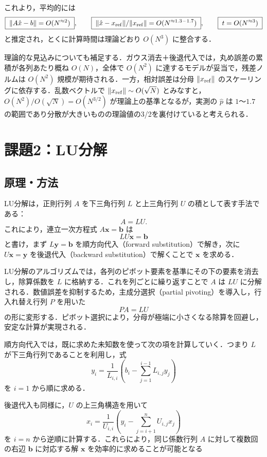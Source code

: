\documentclass[a4paper,11pt]{ltjsarticle}
\begin{document}
これより，平均的には
\[
\boxed{\;\|A\hat x-b\|=O(N^{\approx 2})\;},\qquad
\boxed{\;\|\hat x-x_{\rm ref}\|/\|x_{\rm ref}\|=O(N^{\approx 1.3\,\text{--}\,1.7})\;},\qquad
\boxed{\;t=O(N^{\approx 3})\;}
\]
と推定され，とくに計算時間は理論どおり $O(N^3)$ に整合する．

理論的な見込みについても補足する．ガウス消去＋後退代入では，丸め誤差の累積が各列あたり概ね $O(N)$，全体で $O(N^2)$ に達するモデルが妥当で，残差ノルムは $O(N^2)$ 規模が期待される．一方，相対誤差は分母 $\|x_{\rm ref}\|$ のスケーリングに依存する．乱数ベクトルで $\|x_{\rm ref}\|\sim O(\sqrt N)$ とみなすと，$O(N^2)/O(\sqrt N)=O(N^{3/2})$ が理論上の基準となるが，実測の $\hat p$ は $1$〜$1.7$ の範囲であり分散が大きいものの理論値の3/2を裏付けていると考えられる．



\section{課題2：LU分解}
\subsection{原理・方法}

LU分解は，正則行列 $A$ を下三角行列 $L$ と上三角行列 $U$ の積として表す手法である：
\[
A = LU.
\]
これにより，連立一次方程式 $A\boldsymbol{x} = \boldsymbol{b}$ は
\[
LU\boldsymbol{x} = \boldsymbol{b}
\]
と書け，まず $L\boldsymbol{y} = \boldsymbol{b}$ を順方向代入（forward substitution）で解き，次に $U\boldsymbol{x} = \boldsymbol{y}$ を後退代入（backward substitution）で解くことで $\boldsymbol{x}$ を求める．

LU分解のアルゴリズムでは，各列のピボット要素を基準にその下の要素を消去し，除算係数を $L$ に格納する．これを列ごとに繰り返すことで $A$ は $LU$ に分解される．数値誤差を抑制するため，主成分選択（partial pivoting）を導入し，行入れ替え行列 $P$ を用いた
\[
P A = L U
\]
の形に変形する．ピボット選択により，分母が極端に小さくなる除算を回避し，安定な計算が実現される．

順方向代入では，既に求めた未知数を使って次の項を計算していく．つまり $L$ が下三角行列であることを利用し，式
\[
y_{i} = \frac{1}{L_{i,i}}\left(b_{i} - \sum_{j=1}^{i-1} L_{i,j}y_{j}\right)
\]
を $i=1$ から順に求める．

後退代入も同様に，$U$ の上三角構造を用いて
\[
x_{i} = \frac{1}{U_{i,i}}\left(y_{i} - \sum_{j=i+1}^{n} U_{i,j}x_{j}\right)
\]
を $i=n$ から逆順に計算する．これらにより，同じ係数行列 $A$ に対して複数回の右辺 $\boldsymbol{b}$ に対応する解 $\boldsymbol{x}$ を効率的に求めることが可能となる
\end{document}
